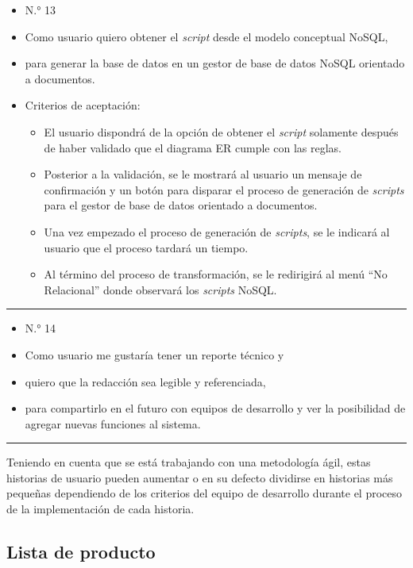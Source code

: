 \begin{itemize}
	\item N.° 13
	\item Como usuario quiero obtener el \textit{script} desde el modelo conceptual NoSQL,
	\item para generar la base de datos en un gestor de base de datos NoSQL orientado a documentos.
	\item Criterios de aceptación:
	\begin{itemize}
		\item El usuario dispondrá de la opción de obtener el \textit{script} solamente después de haber validado que el diagrama ER cumple con las reglas.
		\item Posterior a la validación, se le mostrará al usuario un mensaje de confirmación y un botón para disparar el proceso de generación de \textit{scripts} para el gestor de base de datos orientado a documentos.
		\item Una vez empezado el proceso de generación de \textit{scripts}, se le indicará al usuario que el proceso tardará un tiempo.
		\item Al término del proceso de transformación, se le redirigirá al menú ``No Relacional'' donde observará los \textit{scripts} NoSQL.
	\end{itemize}
\end{itemize}

\noindent\rule{\textwidth}{1pt}
\begin{itemize}
	\item N.° 14
	\item Como usuario me gustaría tener un reporte técnico y
	\item quiero que la redacción sea legible y referenciada,
	\item para compartirlo en el futuro con equipos de desarrollo y ver la posibilidad de agregar nuevas funciones al sistema.
\end{itemize}
\noindent\rule{\textwidth}{1pt}




Teniendo en cuenta que se está trabajando con una metodología ágil, estas historias de usuario pueden aumentar o en su defecto dividirse en historias más pequeñas dependiendo de los criterios del equipo de desarrollo durante el proceso de la implementación de cada historia.




\subsection{Lista de producto}

